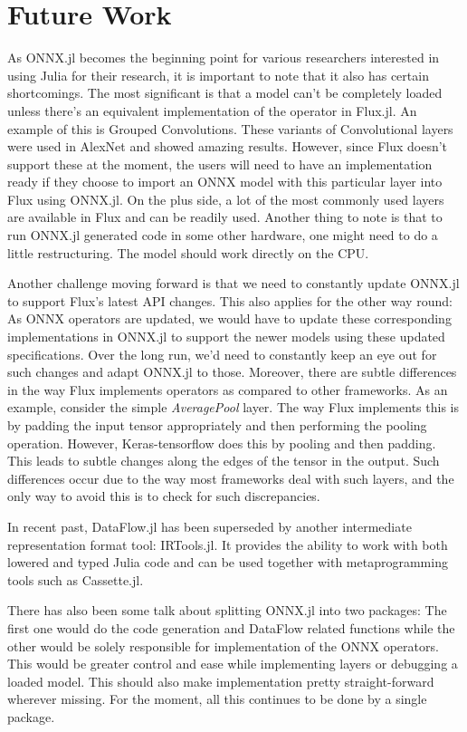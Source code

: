 \documentclass{juliacon}
\begin{document}
\section{Future Work}

As ONNX.jl becomes the beginning point for various researchers interested in using Julia for their research,
it is important to note that it also has certain shortcomings. The most significant is that a model can't
be completely loaded unless there's an equivalent implementation of the operator in Flux.jl. An example of this
is Grouped Convolutions. These variants of Convolutional layers were used in AlexNet \cite{NIPS2012_4824} and showed amazing 
results. However, since Flux doesn't support these at the moment, the users will need to have an implementation
ready if they choose to import an ONNX model with this particular layer into Flux using ONNX.jl. On the plus side,
a lot of the most commonly used layers are available in Flux and can be readily used. Another thing to note is
that to run ONNX.jl generated code in some other hardware, one might need to do a little restructuring. The model
should work directly on the CPU. 

Another challenge moving forward is that we need to constantly update ONNX.jl to support Flux's latest API
changes. This also applies for the other way round: As ONNX operators are updated, we would have to update these
corresponding implementations in ONNX.jl to support the newer models using these updated specifications. Over
the long run, we'd need to constantly keep an eye out for such changes and adapt ONNX.jl to those. Moreover,
there are subtle differences in the way Flux implements operators as compared to other frameworks. As an example,
consider the simple \textit{AveragePool} layer. The way Flux implements this is by padding the input tensor 
appropriately and then performing the pooling operation. However, Keras-tensorflow does this by pooling and then 
padding. This leads to subtle changes along the edges of the tensor in the output. Such differences occur due to
the way most frameworks deal with such layers, and the only way to avoid this is to check for such
discrepancies.

In recent past, DataFlow.jl has been superseded by another intermediate representation format tool: IRTools.jl. 
It provides the ability to work with both lowered and typed Julia code and can be used together with 
metaprogramming tools such as Cassette.jl.  

There has also been some talk about splitting ONNX.jl into two packages: The first one would do the code 
generation and DataFlow related functions while the other would be solely responsible for implementation of the
ONNX operators. This would be greater control and ease while implementing layers or debugging a loaded model. This
should also make implementation pretty straight-forward wherever missing.
For the moment, all this continues to be done by a single package.
\end{document}
